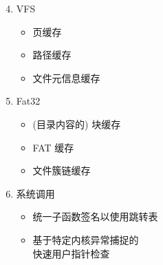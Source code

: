 \begin{frame}
\begin{columns}
        \begin{column}{.5\linewidth}
            \begin{enumerate}
                \setcounter{enumi}{3}
                \item VFS
                      \begin{itemize}
                          \item 页缓存
                          \item 路径缓存
                          \item 文件元信息缓存
                      \end{itemize}
                \item Fat32
                      \begin{itemize}
                          \item (目录内容的) 块缓存
                          \item FAT 缓存
                          \item 文件簇链缓存
                      \end{itemize}
                \item 系统调用
                      \begin{itemize}
                          \item 统一子函数签名以使用跳转表
                          \item 基于特定内核异常捕捉的\\
                                快速用户指针检查
                      \end{itemize}
            \end{enumerate}
        \end{column}
    \end{columns}
\end{frame}
